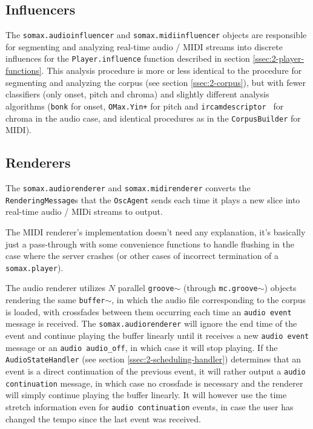 \subsection{Influencers}\label{ssec:3-influencers}
The \texttt{somax.audioinfluencer} and \texttt{somax.midiinfluencer} objects are responsible for segmenting and analyzing real-time audio / MIDI streams into discrete influences for the \texttt{Player.influence} function described in section \ref{ssec:2-player-functions}. This analysis procedure is more or less identical to the procedure for segmenting and analyzing the corpus (see section \ref{ssec:2-corpus}), but with fewer classifiers (only onset, pitch and chroma) and slightly different analysis algorithms (\texttt{bonk} for onset, \texttt{OMax.Yin+} for pitch and \texttt{ircamdescriptor~} for chroma in the audio case, and identical procedures as in the \texttt{CorpusBuilder} for MIDI). 


\subsection{Renderers}\label{ssec:3-renderers}
The \texttt{somax.audiorenderer} and \texttt{somax.midirenderer} converts the \texttt{RenderingMessage}s that the \texttt{OscAgent} sends each time it plays a new slice into real-time audio / MIDi streams to output. 

The MIDI renderer's implementation doesn't need any explanation, it's basically just a pass-through with some convenience functions to handle flushing in the case where the server crashes (or other cases of incorrect termination of a \texttt{somax.player}). 

The audio renderer utilizes $N$ parallel \texttt{groove$\sim$} (through \texttt{mc.groove$\sim$}) objects rendering the same \texttt{buffer$\sim$}, in which the audio file corresponding to the corpus is loaded, with crossfades between them occurring each time an \texttt{audio event} message is received. The \texttt{somax.audiorenderer} will ignore the end time of the event and continue playing the buffer linearly until it receives a new \texttt{audio event} message or an \texttt{audio audio\_off}, in which case it will stop playing. If the \texttt{AudioStateHandler} (see section \ref{ssec:2-scheduling-handler}) determines that an event is a direct continuation of the previous event, it will rather output a \texttt{audio continuation} message, in which case no crossfade is necessary and the renderer will simply continue playing the buffer linearly. It will however use the time stretch information even for \texttt{audio continuation} events, in case the user has changed the tempo since the last event was received.

